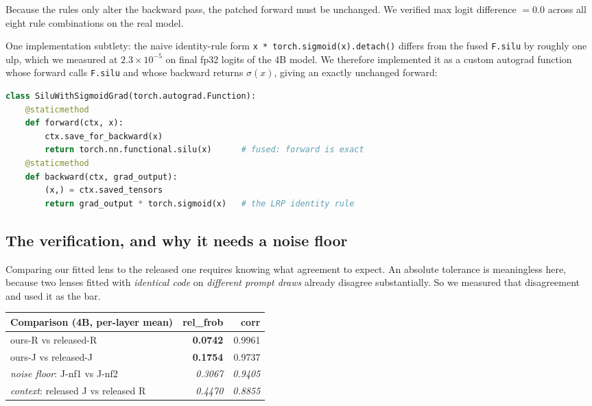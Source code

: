 \documentclass[11pt,a4paper]{article}
\begin{document}
Because the rules only alter the backward pass, the patched forward must be
unchanged. We verified max logit difference $= 0.0$ across all eight rule
combinations on the real model.

One implementation subtlety: the naive identity-rule form
\texttt{x * torch.sigmoid(x).detach()} differs from the fused \texttt{F.silu} by
roughly one ulp, which we measured at $2.3\times10^{-5}$ on final fp32 logits of the
4B model. We therefore implemented it as a custom autograd function whose forward
calls \texttt{F.silu} and whose backward returns $\sigma(x)$, giving an exactly
unchanged forward:

\begin{lstlisting}[language=Python]
class SiluWithSigmoidGrad(torch.autograd.Function):
    @staticmethod
    def forward(ctx, x):
        ctx.save_for_backward(x)
        return torch.nn.functional.silu(x)      # fused: forward is exact
    @staticmethod
    def backward(ctx, grad_output):
        (x,) = ctx.saved_tensors
        return grad_output * torch.sigmoid(x)   # the LRP identity rule
\end{lstlisting}

\subsection{The verification, and why it needs a noise floor}

Comparing our fitted lens to the released one requires knowing what agreement to
expect. An absolute tolerance is meaningless here, because two lenses fitted with
\emph{identical code} on \emph{different prompt draws} already disagree
substantially. So we measured that disagreement and used it as the bar.

\begin{center}
\begin{tabular}{@{}lrr@{}}
\toprule
\textbf{Comparison (4B, per-layer mean)} & \textbf{rel\_frob} & \textbf{corr} \\
\midrule
ours-R vs released-R                     & \textbf{0.0742} & 0.9961 \\
ours-J vs released-J                     & \textbf{0.1754} & 0.9737 \\
\emph{noise floor}: J-nf1 vs J-nf2       & \emph{0.3067}   & \emph{0.9405} \\
\emph{context}: released J vs released R & \emph{0.4470}   & \emph{0.8855} \\
\bottomrule
\end{tabular}
\end{center}
\end{document}
